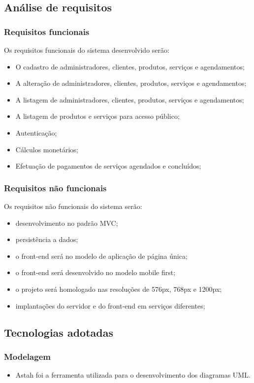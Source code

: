 \subsection{Análise de requisitos}
\subsubsection{Requisitos funcionais}
Os requisitos funcionais do sistema desenvolvido serão: 

\begin{itemize}
	\item O cadastro de administradores, clientes, produtos, serviços e agendamentos;
	\item A alteração de administradores, clientes, produtos, serviços e agendamentos;
	\item A listagem de administradores, clientes, produtos, serviços e agendamentos;
	\item A listagem de produtos e serviços para acesso público;
	\item Autenticação;
	\item Cálculos monetários;
	\item Efetuação de pagamentos de serviços agendados e concluídos;
\end{itemize}

\subsubsection{Requisitos não funcionais}
Os requisitos não funcionais do sistema serão:

\begin{itemize}
	\item desenvolvimento no padrão MVC;
	\item persistência a dados;
	\item o front-end será no modelo de aplicação de página única;
	\item o front-end será desenvolvido no modelo mobile first;
	\item o projeto será homologado nas resoluções de 576px, 768px e 1200px;
	\item implantações do servidor e do front-end em serviços diferentes;
\end{itemize}

\subsection{Tecnologias adotadas}
\subsubsection{Modelagem}
\begin{itemize}
	\item Astah foi a ferramenta utilizada para o desenvolvimento dos diagramas UML.
\end{itemize}
